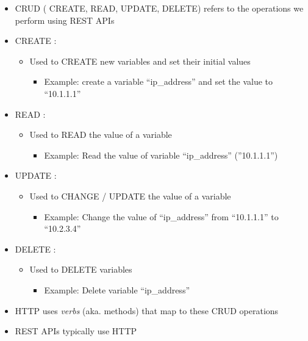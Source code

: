 \begin{itemize}
\item
  CRUD ( CREATE, READ, UPDATE, DELETE) refers to the operations we
  perform using REST APIs
\item
  CREATE :

  \begin{itemize}
  \tightlist
  \item
    Used to CREATE new variables and set their initial values

    \begin{itemize}
    \tightlist
    \item
      Example: create a variable ``ip\_address'' and set the value to
      ``10.1.1.1''
    \end{itemize}
  \end{itemize}
\item
  READ :

  \begin{itemize}
  \tightlist
  \item
    Used to READ the value of a variable

    \begin{itemize}
    \tightlist
    \item
      Example: Read the value of variable ``ip\_address'' (''10.1.1.1'')
    \end{itemize}
  \end{itemize}
\item
  UPDATE :

  \begin{itemize}
  \tightlist
  \item
    Used to CHANGE / UPDATE the value of a variable

    \begin{itemize}
    \tightlist
    \item
      Example: Change the value of ``ip\_address'' from ``10.1.1.1'' to
      ``10.2.3.4''
    \end{itemize}
  \end{itemize}
\item
  DELETE :

  \begin{itemize}
  \tightlist
  \item
    Used to DELETE variables

    \begin{itemize}
    \tightlist
    \item
      Example: Delete variable ``ip\_address''
    \end{itemize}
  \end{itemize}
\item
  HTTP uses \emph{verbs} (aka. methods) that map to these CRUD
  operations
\item
  REST APIs typically use HTTP
\end{itemize}

